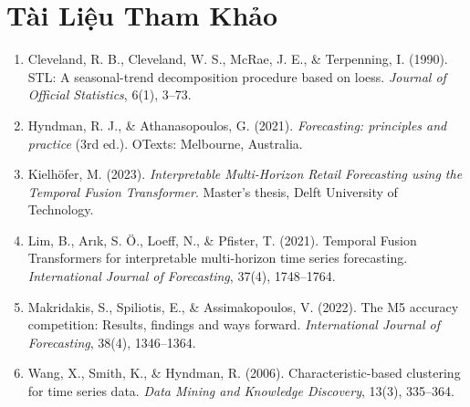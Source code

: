 \documentclass[12pt,a4paper,oneside]{article}
\begin{document}
\section*{Tài Liệu Tham Khảo}
\begin{enumerate}
    \item Cleveland, R. B., Cleveland, W. S., McRae, J. E., \& Terpenning, I. (1990). STL: A seasonal-trend decomposition procedure based on loess. \textit{Journal of Official Statistics}, 6(1), 3--73.
    \item Hyndman, R. J., \& Athanasopoulos, G. (2021). \textit{Forecasting: principles and practice} (3rd ed.). OTexts: Melbourne, Australia.
    \item Kielh{\"o}fer, M. (2023). \textit{Interpretable Multi-Horizon Retail Forecasting using the Temporal Fusion Transformer}. Master's thesis, Delft University of Technology.
    \item Lim, B., Ar{\i}k, S. {\"O}., Loeff, N., \& Pfister, T. (2021). Temporal Fusion Transformers for interpretable multi-horizon time series forecasting. \textit{International Journal of Forecasting}, 37(4), 1748--1764.
    \item Makridakis, S., Spiliotis, E., \& Assimakopoulos, V. (2022). The M5 accuracy competition: Results, findings and ways forward. \textit{International Journal of Forecasting}, 38(4), 1346--1364.
    \item Wang, X., Smith, K., \& Hyndman, R. (2006). Characteristic-based clustering for time series data. \textit{Data Mining and Knowledge Discovery}, 13(3), 335--364.
\end{enumerate}
\end{document}
